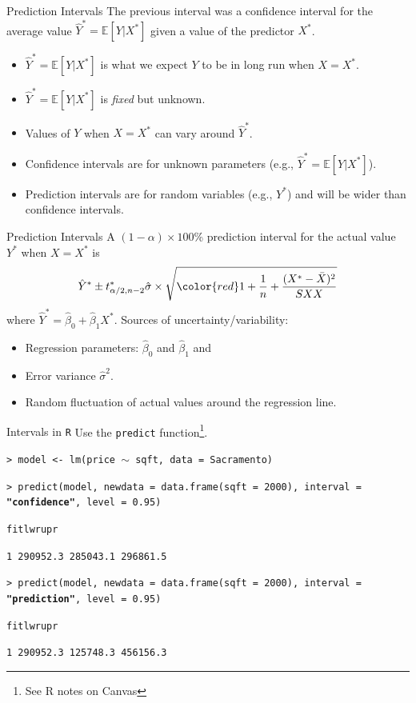 \documentclass{beamer}
\begin{document}
\begin{frame}{Prediction Intervals}
    The previous interval was a confidence interval for the average value $\hat{Y}^* = \mathbb{E}[Y | X^*]$ given a value of the predictor $X^*$.  
    \begin{itemize}[<+->]
        \item $\hat{Y}^* = \mathbb{E}[Y | X^*]$ is what we expect $Y$ to be in long run when $X = X^*$.
        \item $\hat{Y}^* = \mathbb{E}[Y | X^*]$ is \textit{fixed} but unknown.
        \item Values of $Y$ when $X = X^*$ can vary around $\hat{Y}^*$.
        \item Confidence intervals are for unknown parameters (e.g., $\hat{Y}^* = \mathbb{E}[Y | X^*]$).
        \item Prediction intervals are for random variables (e.g., $Y^*$) and will be wider than confidence intervals.
    \end{itemize}
\end{frame}

\begin{frame}{Prediction Intervals}
    A $(1-\alpha)\times 100$\% prediction interval for the actual value $Y^*$ when $X = X^*$ is 
    \begin{equation*}
        \hat{Y}^* \pm t^*_{\alpha/2, n-2} \hat{\sigma} \times \sqrt{{\color{red} 1} + \frac{1}{n} + \frac{(X^* - \bar{X})^2}{SXX}}
    \end{equation*}
    where $\hat{Y}^* = \hat{\beta}_0 + \hat{\beta}_1 X^*$. Sources of uncertainty/variability:
    \begin{itemize}
        \item Regression parameters: $\hat{\beta}_0$ and $\hat{\beta}_1$ and 
        \item Error variance $\hat{\sigma}^2$. 
        \item {\color{red} Random fluctuation of actual values around the regression line.}
    \end{itemize}
\end{frame}

\begin{frame}{Intervals in \texttt{R}}
    Use the \texttt{predict} function\footnote{See R notes on Canvas}. \par 
    \vspace*{1em}
    \footnotesize

    \texttt{> model <- lm(price $\sim$ sqft, data = Sacramento)} \par 
    \texttt{> predict(model, 
    newdata = data.frame(sqft = 2000), 
    interval = \textbf{"confidence"}, 
    level = 0.95)} \par 
    \texttt{\quad\quad\quad\quad fit\quad\quad\quad\quad lwr\quad\quad\quad upr}\par 
    \texttt{1 290952.3 285043.1 296861.5}\par 
    \texttt{> predict(model, 
    newdata = data.frame(sqft = 2000), 
    interval = \textbf{"prediction"}, 
    level = 0.95)} \par 
    \texttt{\quad\quad\quad\quad fit\quad\quad\quad\quad lwr\quad\quad\quad upr}\par 
    \texttt{1 290952.3 125748.3 456156.3}
\end{frame}
\end{document}
